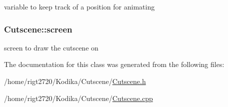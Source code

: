variable to keep track of a position for animating 

\hypertarget{classCutscene_a70df90fafe45f9a661d9e05ac4dd2a22}{
\subsubsection[{screen}]{ Cutscene\-::screen\hspace{0.3cm}{\ttfamily [private]}}}\label{classCutscene_a70df90fafe45f9a661d9e05ac4dd2a22}


screen to draw the cutscene on 



The documentation for this class was generated from the following files\-:\begin{DoxyCompactItemize}
\item 
/home/rigt2720/\-Kodika/\-Cutscene/\hyperlink{Cutscene_8h}{Cutscene.\-h}\item 
/home/rigt2720/\-Kodika/\-Cutscene/\hyperlink{Cutscene_8cpp}{Cutscene.\-cpp}\end{DoxyCompactItemize}

